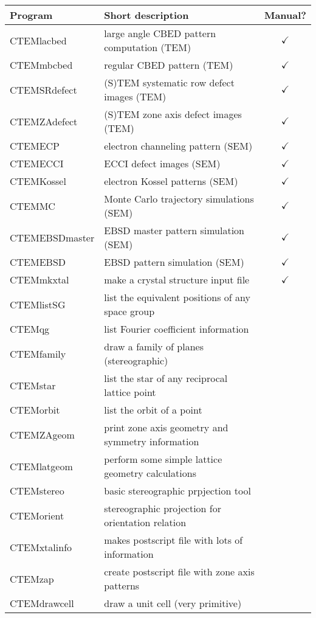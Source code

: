 \documentclass[DIV=calc, paper=letter, fontsize=11pt]{scrartcl}	 %
\begin{document}
\begin{table*}[h]
\centering\leavevmode
\begin{tabular}{|l|l|c|}
\hline
Program & Short description & Manual? \\
\hline\hline
  \textsf{CTEMlacbed} & large angle CBED pattern computation (TEM)& $\checkmark$ \\
  \textsf{CTEMmbcbed} & regular CBED pattern (TEM)& $\checkmark$\\
  \textsf{CTEMSRdefect} & (S)TEM systematic row defect images (TEM) & $\checkmark$\\
  \textsf{CTEMZAdefect} & (S)TEM zone axis defect images (TEM) & $\checkmark$\\
  \textsf{CTEMECP} & electron channeling pattern (SEM) & $\checkmark$\\
  \textsf{CTEMECCI} & ECCI defect images (SEM) & $\checkmark$\\
  \textsf{CTEMKossel} & electron Kossel patterns (SEM) & $\checkmark$\\
  \textsf{CTEMMC} & Monte Carlo trajectory simulations (SEM) & $\checkmark$\\
  \textsf{CTEMEBSDmaster} & EBSD master pattern simulation (SEM) & $\checkmark$\\
  \textsf{CTEMEBSD} & EBSD pattern simulation (SEM) & $\checkmark$\\
\hline
  \textsf{CTEMmkxtal} & make a crystal structure input file& $\checkmark$\\
  \textsf{CTEMlistSG} & list the equivalent positions of any space group & \\
  \textsf{CTEMqg} & list Fourier coefficient information & \\
  \textsf{CTEMfamily} & draw a family of planes (stereographic) & \\
  \textsf{CTEMstar} & list the star of any reciprocal lattice point & \\
  \textsf{CTEMorbit} & list the orbit of a point & \\
  \textsf{CTEMZAgeom} & print zone axis geometry and symmetry information & \\
  \textsf{CTEMlatgeom} & perform some simple lattice geometry calculations & \\
  \textsf{CTEMstereo} & basic stereographic prpjection tool & \\
  \textsf{CTEMorient} & stereographic projection for orientation relation & \\
  \textsf{CTEMxtalinfo} & makes postscript file with lots of information & \\
  \textsf{CTEMzap} & create postscript file with zone axis patterns & \\
  \textsf{CTEMdrawcell} & draw a unit cell (very primitive) & \\
\hline
\end{tabular}
\end{table*}
\end{document}
